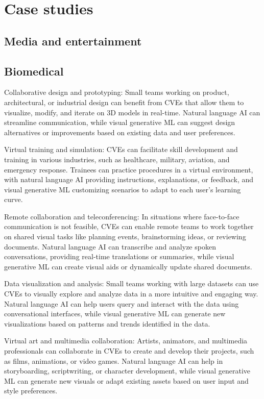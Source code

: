\section{Case studies}
\subsection{Media and entertainment}
\subsection{Biomedical}
    Collaborative design and prototyping:
    Small teams working on product, architectural, or industrial design can benefit from CVEs that allow them to visualize, modify, and iterate on 3D models in real-time. Natural language AI can streamline communication, while visual generative ML can suggest design alternatives or improvements based on existing data and user preferences.

    Virtual training and simulation:
    CVEs can facilitate skill development and training in various industries, such as healthcare, military, aviation, and emergency response. Trainees can practice procedures in a virtual environment, with natural language AI providing instructions, explanations, or feedback, and visual generative ML customizing scenarios to adapt to each user's learning curve.

    Remote collaboration and teleconferencing:
    In situations where face-to-face communication is not feasible, CVEs can enable remote teams to work together on shared visual tasks like planning events, brainstorming ideas, or reviewing documents. Natural language AI can transcribe and analyze spoken conversations, providing real-time translations or summaries, while visual generative ML can create visual aids or dynamically update shared documents.

    Data visualization and analysis:
    Small teams working with large datasets can use CVEs to visually explore and analyze data in a more intuitive and engaging way. Natural language AI can help users query and interact with the data using conversational interfaces, while visual generative ML can generate new visualizations based on patterns and trends identified in the data.

    Virtual art and multimedia collaboration:
    Artists, animators, and multimedia professionals can collaborate in CVEs to create and develop their projects, such as films, animations, or video games. Natural language AI can help in storyboarding, scriptwriting, or character development, while visual generative ML can generate new visuals or adapt existing assets based on user input and style preferences.


